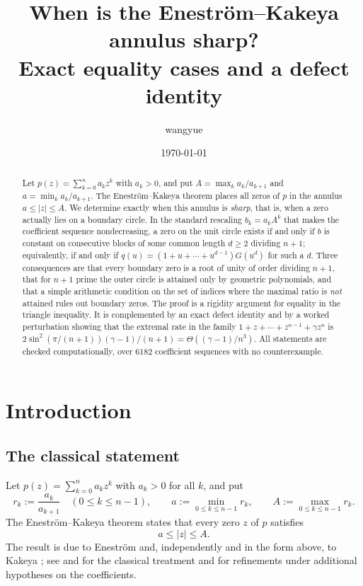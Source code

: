 \documentclass[11pt]{amsart}
\title[Sharpness of the Enestr\"om--Kakeya annulus]{When is the Enestr\"om--Kakeya annulus sharp?\\[2pt]
Exact equality cases and a defect identity}
\author{wangyue}
\date{\today}
\theoremstyle{plain}
\theoremstyle{definition}
\theoremstyle{remark}
\newcommand{\abs}[1]{\lvert #1\rvert}
\begin{document}
\begin{abstract}
Let $p(z)=\sum_{k=0}^{n}a_kz^k$ with $a_k>0$, and put $A=\max_k a_k/a_{k+1}$ and
$a=\min_k a_k/a_{k+1}$. The Enestr\"om--Kakeya theorem places all zeros of $p$ in the
annulus $a\le\abs{z}\le A$. We determine exactly when this annulus is \emph{sharp}, that
is, when a zero actually lies on a boundary circle. In the standard rescaling
$b_k=a_kA^{k}$ that makes the coefficient sequence nondecreasing, a zero on the unit circle
exists if and only if $b$ is constant on consecutive blocks of some common length
$d\ge2$ dividing $n+1$; equivalently, if and only if
$q(u)=(1+u+\cdots+u^{d-1})G(u^{d})$ for such a $d$. Three consequences are that every
boundary zero is a root of unity of order dividing $n+1$, that for $n+1$ prime the outer
circle is attained only by geometric polynomials, and that a simple arithmetic condition on
the set of indices where the maximal ratio is \emph{not} attained rules out boundary zeros.
The proof is a rigidity argument for equality in the triangle inequality. It is complemented
by an exact defect identity and by a worked perturbation showing that the extremal rate in
the family $1+z+\cdots+z^{n-1}+\gamma z^{n}$ is
$2\sin^{2}(\pi/(n+1))(\gamma-1)/(n+1)=\Theta((\gamma-1)/n^{3})$. All statements are checked
computationally, over $6182$ coefficient sequences with no counterexample.
\end{abstract}

\maketitle

\section{Introduction}

\subsection{The classical statement}

Let $p(z)=\sum_{k=0}^{n}a_kz^k$ with $a_k>0$ for all $k$, and put
\begin{equation}\label{eq:ratios}
r_k:=\frac{a_k}{a_{k+1}}\quad(0\le k\le n-1),\qquad
a:=\min_{0\le k\le n-1}r_k,\qquad A:=\max_{0\le k\le n-1}r_k .
\end{equation}
The Enestr\"om--Kakeya theorem states that every zero $z$ of $p$ satisfies
\begin{equation}\label{eq:EK}
a\le\abs{z}\le A .
\end{equation}
The result is due to Enestr\"om \cite{Enestrom} and, independently and in the form above, to
Kakeya \cite{Kakeya}; see \cite[\S27]{Marden} and \cite[Chapter~4]{RS2002} for the classical
treatment and for refinements under additional hypotheses on the coefficients.
\end{document}
